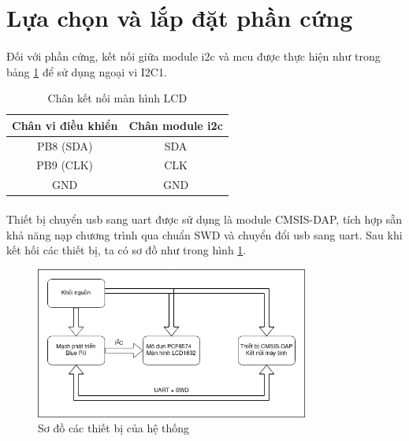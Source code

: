 \section{Lựa chọn và lắp đặt phần cứng}
\paragraph{}
Đối với phần cứng, kết nối giữa module \acrshort{i2c} và \acrlong{mcu} được thực hiện như trong bảng \ref{tab:lcd-wiring} để sử dụng ngoại vi I2C1.

\begin{table}[H]
    \centering
    \caption{Chân kết nối màn hình LCD}
    \begin{tabular}{|c|c|}
        \hline
        Chân vi điều khiển & Chân module \acrshort{i2c} \\
        \hline
        PB8 (SDA) & SDA \\
        \hline
        PB9 (CLK) & CLK \\
        \hline
        GND & GND \\
        \hline
    \end{tabular}
    \label{tab:lcd-wiring}
\end{table}

\paragraph{}
Thiết bị chuyển \acrshort{usb} sang \acrshort{uart} được sử dụng là module CMSIS-DAP, tích hợp sẵn khả năng nạp chương trình qua chuẩn SWD và chuyển đổi \acrshort{usb} sang \acrshort{uart}. Sau khi kết hối các thiết bị, ta có sơ đồ như trong hình \ref{fig:dev-block}.

\begin{figure}[H]
    \centering
    \includegraphics[width=0.8\textwidth]{images/arm-co-ban-device-block-diagram.drawio.png}
    \caption{Sơ đồ các thiết bị của hệ thống}
    \label{fig:dev-block}
\end{figure}

